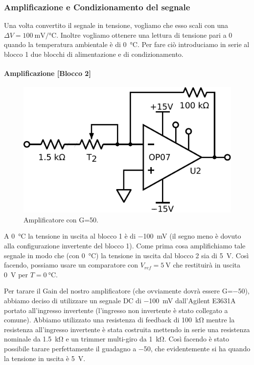 \subsubsection{Amplificazione e Condizionamento del segnale}
Una volta convertito il segnale in tensione, vogliamo che esso scali con una $\Delta V=\SI{100}{\milli\volt}/\si{\celsius}$.
Inoltre vogliamo ottenere una lettura di tensione pari a \num{0} quando la temperatura ambientale è di \SI{0}{\celsius}.
Per fare ciò introduciamo in serie al blocco 1 due blocchi di alimentazione e di condizionamento.

\paragraph{Amplificazione [Blocco 2]\newline}

\begin{figure}
\centering
\includegraphics[width=.3\textwidth]{../E06/latex/P2.pdf}
\caption{Amplificatore con G=50.}
\label{cir6:blocco2}
\end{figure}

A \SI{0}{\celsius} la tensione in uscita al blocco 1 è di \SI{-100}{\mV} (il segno meno è dovuto alla configurazione invertente del blocco 1).
Come prima cosa amplifichiamo tale segnale in modo che (con \SI{0}{\celsius}) la tensione in uscita dal blocco 2 sia di \SI{5}{\volt}.
Così facendo, possiamo usare un comparatore con $V_{ref}=\SI{5}{\volt}$ che restituirà in uscita \SI{0}{\volt} per $T=\SI{0}{\celsius}$.

Per tarare il Gain del nostro amplificatore (che ovviamente dovrà essere G=\num{-50}), abbiamo deciso di utilizzare un segnale DC di \SI{-100}{\mV} dall'Agilent E3631A portato all'ingresso invertente (l'ingresso non invertente è stato collegato a comune).
Abbiamo utilizzato una resistenza di feedback di \SI{100}{\kilo\ohm} mentre la resistenza all'ingresso invertente è stata costruita mettendo in serie una resistenza nominale da \SI{1.5}{\kilo\ohm} e un trimmer multi-giro da \SI{1}{\kilo\ohm}.
Così facendo è stato possibile tarare perfettamente il guadagno a \num{-50}, che evidentemente si ha quando la tensione in uscita è \SI{5}{\volt}. 

